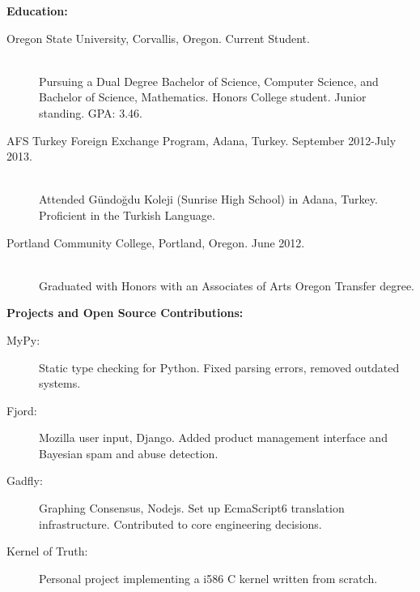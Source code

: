 \documentclass[11pt]{article}
\begin{document}
\bigskip

{\Large \bf Education:}
\begin{description}
	\item[Oregon State University, Corvallis, Oregon.
		\hfill Current Student.]
		\hfill \\
		Pursuing a Dual Degree Bachelor of Science, Computer Science,
		and Bachelor of Science, Mathematics.
		Honors College student. Junior standing. GPA: 3.46.
		
	\item[AFS Turkey Foreign Exchange Program, Adana, Turkey.
		\hfill September 2012-July 2013.]
		\hfill \\
		Attended G{\" u}ndo{\u g}du Koleji (Sunrise High School) in Adana, 
		Turkey. Proficient in the Turkish Language.

	\item[Portland Community College, Portland, Oregon.
		\hfill June 2012.]
		\hfill \\
		Graduated with Honors with an Associates of Arts 
		Oregon Transfer degree.

\end{description}

\bigskip

{\Large \bf Projects and Open Source Contributions:}
\begin{description}
\item[MyPy:] Static type checking for Python. Fixed parsing errors,
	removed outdated systems.
\item[Fjord:] Mozilla user input, Django. Added product management interface
	and Bayesian spam and abuse detection.
\item[Gadfly:] Graphing Consensus, Nodejs. Set up EcmaScript6 translation
	infrastructure. Contributed to core engineering decisions.
\item[Kernel of Truth:] Personal project implementing a i586 C kernel written
	from scratch.
\end{description}
\end{document}

